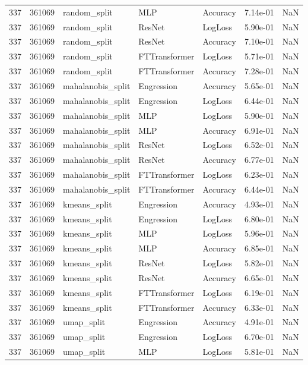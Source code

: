\begin{tabular}{rrlllrr}
337 & 361069 & random\_split & MLP & Accuracy & 7.14e-01 & NaN \\
337 & 361069 & random\_split & ResNet & LogLoss & 5.90e-01 & NaN \\
337 & 361069 & random\_split & ResNet & Accuracy & 7.10e-01 & NaN \\
337 & 361069 & random\_split & FTTransformer & LogLoss & 5.71e-01 & NaN \\
337 & 361069 & random\_split & FTTransformer & Accuracy & 7.28e-01 & NaN \\
337 & 361069 & mahalanobis\_split & Engression & Accuracy & 5.65e-01 & NaN \\
337 & 361069 & mahalanobis\_split & Engression & LogLoss & 6.44e-01 & NaN \\
337 & 361069 & mahalanobis\_split & MLP & LogLoss & 5.90e-01 & NaN \\
337 & 361069 & mahalanobis\_split & MLP & Accuracy & 6.91e-01 & NaN \\
337 & 361069 & mahalanobis\_split & ResNet & LogLoss & 6.52e-01 & NaN \\
337 & 361069 & mahalanobis\_split & ResNet & Accuracy & 6.77e-01 & NaN \\
337 & 361069 & mahalanobis\_split & FTTransformer & LogLoss & 6.23e-01 & NaN \\
337 & 361069 & mahalanobis\_split & FTTransformer & Accuracy & 6.44e-01 & NaN \\
337 & 361069 & kmeans\_split & Engression & Accuracy & 4.93e-01 & NaN \\
337 & 361069 & kmeans\_split & Engression & LogLoss & 6.80e-01 & NaN \\
337 & 361069 & kmeans\_split & MLP & LogLoss & 5.96e-01 & NaN \\
337 & 361069 & kmeans\_split & MLP & Accuracy & 6.85e-01 & NaN \\
337 & 361069 & kmeans\_split & ResNet & LogLoss & 5.82e-01 & NaN \\
337 & 361069 & kmeans\_split & ResNet & Accuracy & 6.65e-01 & NaN \\
337 & 361069 & kmeans\_split & FTTransformer & LogLoss & 6.19e-01 & NaN \\
337 & 361069 & kmeans\_split & FTTransformer & Accuracy & 6.33e-01 & NaN \\
337 & 361069 & umap\_split & Engression & Accuracy & 4.91e-01 & NaN \\
337 & 361069 & umap\_split & Engression & LogLoss & 6.70e-01 & NaN \\
337 & 361069 & umap\_split & MLP & LogLoss & 5.81e-01 & NaN \\

\end{tabular}
